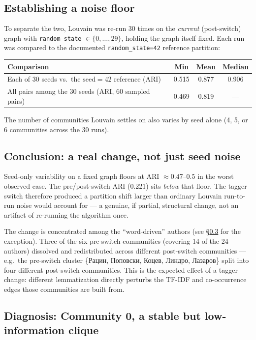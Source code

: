 \documentclass[11pt]{article}
\begin{document}
\subsection{Establishing a noise floor}

To separate the two, Louvain was re-run 30 times on the \emph{current}
(post-switch) graph with \texttt{random\_state} $\in \{0, \dots, 29\}$,
holding the graph itself fixed. Each run was compared to the documented
\texttt{random\_state=42} reference partition:

\begin{center}
\begin{tabular}{lccc}
\toprule
Comparison & Min & Mean & Median \\
\midrule
Each of 30 seeds vs.\ the $\text{seed}=42$ reference (ARI) & 0.515 & 0.877 & 0.906 \\
All pairs among the 30 seeds (ARI, 60 sampled pairs) & 0.469 & 0.819 & --- \\
\bottomrule
\end{tabular}
\end{center}

The number of communities Louvain settles on also varies by seed alone (4,
5, or 6 communities across the 30 runs).

\subsection{Conclusion: a real change, not just seed noise}

Seed-only variability on a fixed graph floors at ARI $\approx 0.47$--$0.5$ in
the worst observed case. The pre/post-switch ARI (0.221) sits
\emph{below} that floor. The tagger switch therefore produced a partition
shift larger than ordinary Louvain run-to-run noise would account for — a
genuine, if partial, structural change, not an artifact of re-running the
algorithm once.

The change is concentrated among the ``word-driven'' authors (see
\S\ref{sec:community0} for the exception). Three of the six pre-switch
communities (covering 14 of the 24 authors) dissolved and redistributed
across different post-switch communities — e.g.\ the pre-switch cluster
\{Рацин, Поповски, Коцев, Линдро, Лазаров\} split into four different
post-switch communities. This is the expected effect of a tagger change:
different lemmatization directly perturbs the TF-IDF and co-occurrence edges
those communities are built from.

\subsection{Diagnosis: Community 0, a stable but low-information clique}
\label{sec:community0}
\end{document}
